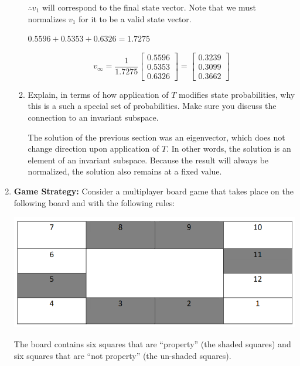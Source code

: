 \documentclass[fleqn]{article}
\begin{document}
\begin{enumerate}[nolistsep]
\begin{enumerate}
			$\therefore v_1$ will correspond to the final state vector. Note that we must normalizes $v_1$ for it to be a valid state vector.
			
			$0.5596 + 0.5353 + 0.6326 = 1.7275$
			
			\begin{equation*}
				v_{\infty} = \frac{1}{1.7275}\begin{bmatrix}
					0.5596 \\
					0.5353 \\
					0.6326
				\end{bmatrix} = \pmb{\begin{bmatrix}
					0.3239 \\
					0.3099 \\
					0.3662
				\end{bmatrix}}
			\end{equation*}
			
			\item Explain, in terms of how application of $T$ modifies state probabilities, why this is a such a special set of probabilities. Make sure you discuss the connection to an invariant subspace.
			
			The solution of the previous section was an eigenvector, which does not change direction upon application of $T$. In other words, the solution is an element of an invariant subspace. Because the result will always be normalized, the solution also remains at a fixed value.
		\end{enumerate}
		
		\item \textbf{Game Strategy:} Consider a multiplayer board game that takes place on the following board and with the following rules:
		
		\begin{minipage}{\linewidth}
    			\centerline{\includegraphics[scale=0.8]{monopoly_board.png}}
  		\end{minipage}	
		
		The board contains six squares that are “property” (the shaded squares) and six squares that are “not property” (the un-shaded squares).
		

\end{enumerate}
\end{document}
